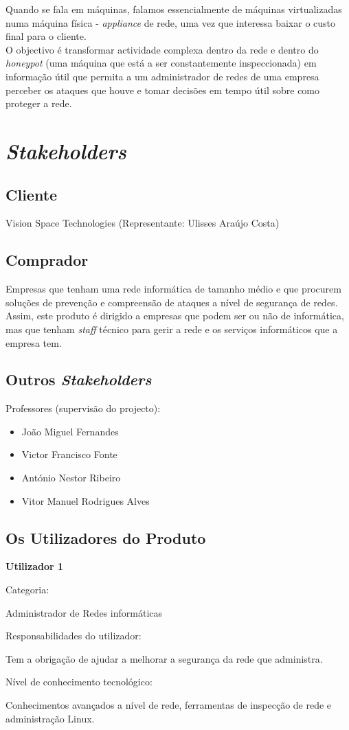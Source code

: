 Quando se fala em máquinas, falamos essencialmente de máquinas virtualizadas numa máquina física - \emph{appliance} de rede,
uma vez que interessa baixar o custo final para o cliente.\\

O objectivo é transformar actividade complexa dentro da rede e dentro do \emph{honeypot} (uma máquina que está a ser constantemente inspeccionada) em
informação útil que permita a um administrador de redes de uma empresa perceber os ataques que houve e tomar decisões em tempo útil sobre como proteger a rede.

\section{\emph{Stakeholders}}

\subsection{Cliente}
Vision Space Technologies (Representante: Ulisses Araújo Costa)

\subsection{Comprador}
Empresas que tenham uma rede informática de tamanho médio e que procurem soluções de prevenção e compreensão de ataques a nível de segurança de redes.
Assim, este produto é dirigido a empresas que podem ser ou não de informática, mas que tenham \emph{staff} técnico para gerir a rede e os serviços
informáticos que a empresa tem.

\subsection{Outros \emph{Stakeholders}}
Professores (supervisão do projecto):
\begin{itemize}
\item João Miguel Fernandes
\item Victor Francisco Fonte
\item António Nestor Ribeiro
\item Vitor Manuel Rodrigues Alves
\end{itemize}
\subsection{Os Utilizadores do Produto}
\begin{description}
\item \textbf{Utilizador 1}
\item Categoria: 

Administrador de Redes informáticas
\item Responsabilidades do utilizador: 

Tem a obrigação de ajudar a melhorar a segurança da rede que administra.
\item Nível de conhecimento tecnológico: 

Conhecimentos avançados a nível de rede, ferramentas de inspecção de rede e administração Linux.
\end{description}

